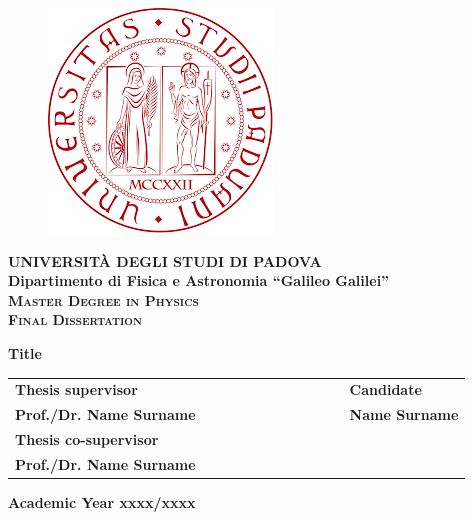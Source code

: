 \begin{titlepage}
\vspace{5mm}
\begin{figure}[hbtp]
\centering
\includegraphics[scale=.43]{images/UNIPD.png}
\end{figure}
\vspace{5mm}
\begin{center}
{{\huge{\textsc{\bf UNIVERSIT\`A DEGLI STUDI DI PADOVA}}}\\}
\vspace{5mm}
{\Large{\bf Dipartimento di Fisica e Astronomia ``Galileo Galilei''}} \\
\vspace{5mm}
{\Large{\textsc{\bf Master Degree in Physics}}}\\
\vspace{20mm}
{\Large{\textsc{\bf Final Dissertation}}}\\
\vspace{30mm}
\begin{spacing}{3}
{\LARGE \textbf{Title}}\\
\end{spacing}
\vspace{8mm}
\end{center}

\vspace{20mm}
\begin{spacing}{2}
\begin{tabular}{ l  c  c c c  cc c c c c  l }
{\Large{\bf Thesis supervisor}} &&&&&&&&&&& {\Large{\bf Candidate}}\\
{\Large{\bf Prof./Dr. Name Surname}} &&&&&&&&&&& {\Large{\bf Name Surname}}\\
{\Large{\bf Thesis co-supervisor}}\\
{\Large{\bf Prof./Dr. Name Surname}}\\
\end{tabular}
\end{spacing}
\vspace{15 mm}

\begin{center}
{\Large{\bf Academic Year xxxx/xxxx}}
\end{center}
\end{titlepage}







